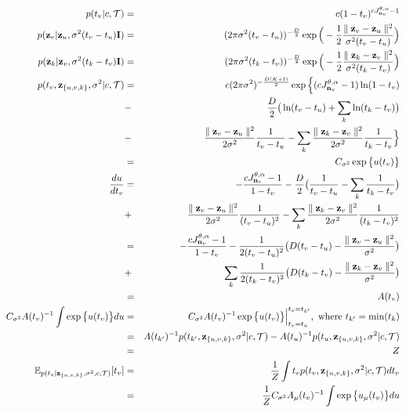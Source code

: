 \documentclass{article}
\begin{document}
	\begin{eqnarray}
	p(t_v | c, \mathcal{T}) &=& c(1-t_v)^{cJ^{\theta,\alpha}_{\bold{n}_v} - 1} \\
	p(\bold{z}_v | \bold{z}_u, \sigma^2(t_v - t_u)\bold{I}) &=& (2 \pi \sigma^2(t_v - t_u))^{-\frac{D}{2}} \exp \Big(-\frac{1}{2}\frac{\parallel \bold{z}_v - \bold{z}_u \parallel^2}{\sigma^2 (t_v - t_u)} \Big)\\
	p(\bold{z}_k | \bold{z}_v, \sigma^2(t_k - t_v)\bold{I}) &=& (2 \pi \sigma^2(t_k - t_v))^{-\frac{D}{2}} \exp \Big(-\frac{1}{2}\frac{\parallel \bold{z}_k - \bold{z}_v \parallel^2}{\sigma^2 (t_k - t_v)} \Big)\\
	p(t_v, \bold{z}_{\{u,v,k\}}, \sigma^2 | c, \mathcal{T}) & = & c(2 \pi \sigma^2)^{-\frac{D(K + 1)}{2}}\exp \Big\{(cJ^{\theta,\alpha}_{\bold{n}_v} - 1)\ln(1 - t_v) \nonumber \\
	 &-& \frac{D}{2} \big( \ln(t_v - t_u) + \sum_k \ln(t_k - t_v) \big) \nonumber \\
	 &-& \frac{\parallel \bold{z}_v - \bold{z}_u\parallel^2}{2\sigma^2}\frac{1}{t_v - t_u} - \sum_k \frac{\parallel \bold{z}_k - \bold{z}_v\parallel^2}{2\sigma^2}\frac{1}{t_k - t_v} \Big\}  \nonumber\\
	 &=& C_{\sigma^2} \exp \big\{ u(t_v) \big\}\\
	\frac{du}{dt_v} &=& -\frac{cJ^{\theta,\alpha}_{\bold{n}_v} - 1}{1 - t_v} - \frac{D}{2}\big( \frac{1}{t_v - t_u} - \sum_k\frac{1}{t_k - t_v}\big) \nonumber \\
	 &+& \frac{\parallel \bold{z}_v - \bold{z}_u\parallel^2}{2\sigma^2}\frac{1}{(t_v - t_u)^2} - \sum_k \frac{\parallel \bold{z}_k - \bold{z}_v\parallel^2}{2\sigma^2}\frac{1}{(t_k - t_v)^2} \nonumber \\
	 &=& -\frac{cJ^{\theta,\alpha}_{\bold{n}_v} - 1}{1 - t_v} - \frac{1}{2(t_v - t_u)^2} \big(D(t_v - t_u) - \frac{\parallel \bold{z}_v - \bold{z}_u\parallel^2}{\sigma^2} \big) \nonumber \\
	 &+& \sum_k \frac{1}{2(t_k - t_v)^2} \big(D(t_k - t_v) - \frac{\parallel \bold{z}_k - \bold{z}_v\parallel^2}{\sigma^2} \big) \nonumber \\
	 &=& A(t_v)\\
	 C_{\sigma^2} A(t_v)^{-1} \int \exp \big\{u(t_v)\big\}du &=& C_{\sigma^2} A(t_v)^{-1} \exp \big\{u(t_v)\big\}\Big\vert^{t_v = t_{k'}}_{t_v = t_u} ,\textrm{ where } t_{k'} = \min(t_k) \nonumber \\
	 &=& A(t_{k'})^{-1}p(t_{k'}, \bold{z}_{\{u,v,k\}}, \sigma^2 | c, \mathcal{T}) - A(t_{u})^{-1}p(t_{u}, \bold{z}_{\{u,v,k\}}, \sigma^2 | c, \mathcal{T})\nonumber \\
	 &=& Z \\
	\mathbb{E}_{p(t_v | \bold{z}_{\{u,v,k\}}, \sigma^2, c, \mathcal{T})}[t_v] &=& \frac{1}{Z} \int t_v p(t_v, \bold{z}_{\{u,v,k\}}, \sigma^2 | c, \mathcal{T}) dt_v \nonumber \\
	&=& \frac{1}{Z} C_{\sigma^2} A_\mu(t_v)^{-1} \int \exp \big\{ u_\mu(t_v)\big\}du
	\end{eqnarray}
	
\end{document}
